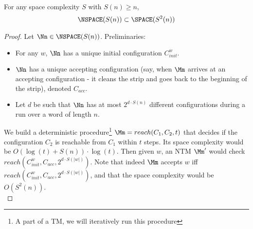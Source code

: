 \begin{blueBox}
	\begin{thm}
		For any space complexity $S$ with $S(n) \geq n$, \[\NSPACE(S(n)) \subset \SPACE(S^2(n))\]
	\end{thm}
\end{blueBox}
\begin{proof}
	Let $\Nn\in \NSPACE(S(n))$. Preliminaries: 
	\begin{itemize}
		\item For any $w$, $\Nn$ has a unique initial configuration $C_{init}^w$.
		\item $\Nn$ has a unique accepting configuration (say, when $\Mm$ arrives at an accepting configuration - it cleans the strip and goes back to the beginning of the strip), denoted $C_{acc}$.
		\item Let $d$ be such that $\Nn$ has at most $2^{d\cdot S(n)}$ different configurations during a run over a word of length $n$.
	\end{itemize} 
We build a deterministic procedure\footnote{A part of a TM, we will iteratively run this procedure} $\Mm = reach(C_1, C_2, t)$ that decides if the configuration $C_2$ is reachable from $C_1$ within $t$ steps. Its space complexity would be $O(\log(t) + S(n))\cdot \log(t)$. Then given $w$, an NTM $\Mm'$ would check $reach(C_{init}^w, C_{acc}, 2^{d\cdot S(|w|)})$. Note that indeed $\Mm$ accepts $w$ iff $reach(C_{init}^w, C_{acc}, 2^{d\cdot S(|w|)})$, and that the space complexity would be $O(S^2(n))$.\\


\end{proof}
